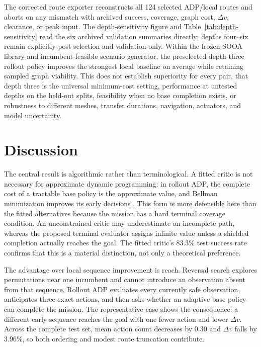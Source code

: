 \documentclass{IEEEtaes}
\theoremstyle{remark}
\theoremstyle{plain}
\begin{document}
The corrected route exporter reconstructs all 124 selected ADP/local routes and aborts on any mismatch with archived success, coverage, graph cost, $\Delta v$, clearance, or peak input. The depth-sensitivity figure and Table~\ref{tab:depth-sensitivity} read the six archived validation summaries directly; depths four--six remain explicitly post-selection and validation-only. Within the frozen SOOA library and incumbent-feasible scenario generator, the preselected depth-three rollout policy improves the strongest local baseline on average while retaining sampled graph viability. This does not establish superiority for every pair, that depth three is the universal minimum-cost setting, performance at untested depths on the held-out splits, feasibility when no base completion exists, or robustness to different meshes, transfer durations, navigation, actuators, and model uncertainty.

\section{Discussion}
\label{sec:discussion}

The central result is algorithmic rather than terminological. A fitted critic is not necessary for approximate dynamic programming: in rollout ADP, the complete cost of a tractable base policy is the approximate value, and Bellman minimization improves its early decisions \cite{bertsekas2020rollout}. This form is more defensible here than the fitted alternatives because the mission has a hard terminal coverage condition. An unconstrained critic may underestimate an incomplete path, whereas the proposed terminal evaluator assigns infinite value unless a shielded completion actually reaches the goal. The fitted critic's 83.3\% test success rate confirms that this is a material distinction, not only a theoretical preference.

The advantage over local sequence improvement is reach. Reversal search explores permutations near one incumbent and cannot introduce an observation absent from that sequence. Rollout ADP evaluates every currently safe observation, anticipates three exact actions, and then asks whether an adaptive base policy can complete the mission. The representative case shows the consequence: a different early sequence reaches the goal with one fewer action and lower $\Delta v$. Across the complete test set, mean action count decreases by 0.30 and $\Delta v$ falls by 3.96\%, so both ordering and modest route truncation contribute.
\end{document}

